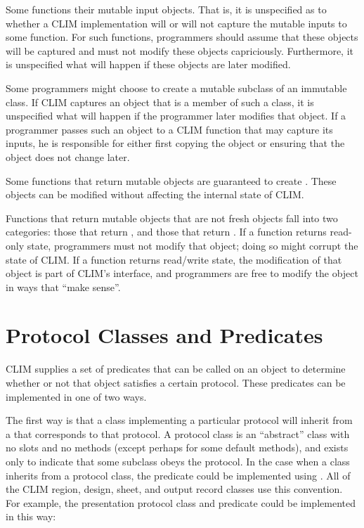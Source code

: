 Some functions  their mutable input objects.  That is, it
is unspecified as to whether a CLIM implementation will or will not capture the
mutable inputs to some function.  For such functions, programmers should assume
that these objects will be captured and must not modify these objects
capriciously.  Furthermore, it is unspecified what will happen if these objects
are later modified.

Some programmers might choose to create a mutable subclass of an immutable
class.  If CLIM captures an object that is a member of such a class, it is
unspecified what will happen if the programmer later modifies that object.  If a
programmer passes such an object to a CLIM function that may capture its inputs,
he is responsible for either first copying the object or ensuring that the
object does not change later.

Some functions that return mutable objects are guaranteed to create
.  These objects can be modified without affecting the
internal state of CLIM.

Functions that return mutable objects that are not fresh objects fall into two
categories: those that return , and those that return
.  If a function returns read-only state, programmers
must not modify that object; doing so might corrupt the state of CLIM.  If a
function returns read/write state, the modification of that object is part of
CLIM's interface, and programmers are free to modify the object in ways that
``make sense''.


\section {Protocol Classes and Predicates}

CLIM supplies a set of predicates that can be called on an object to determine
whether or not that object satisfies a certain protocol.  These predicates can
be implemented in one of two ways.

The first way is that a class implementing a particular protocol will inherit
from a  that corresponds to that protocol.  A protocol
class is an ``abstract'' class with no slots and no methods (except perhaps for
some default methods), and exists only to indicate that some subclass obeys the
protocol.  In the case when a class inherits from a protocol class, the
predicate could be implemented using .  All of the CLIM region,
design, sheet, and output record classes use this convention.  For example, the
presentation protocol class and predicate could be implemented in this way:

